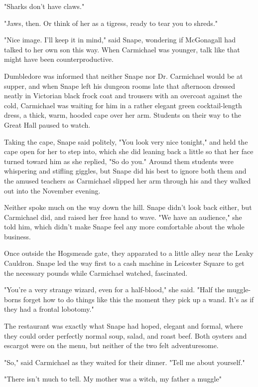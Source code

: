 "Sharks don't have claws."

"Jaws, then. Or think of her as a tigress, ready to tear you to shreds."

"Nice image. I'll keep it in mind," said Snape, wondering if McGonagall had talked to her own son this way. When Carmichael was younger, talk like that might have been counterproductive.

Dumbledore was informed that neither Snape nor Dr. Carmichael would be at supper, and when Snape left his dungeon rooms late that afternoon dressed neatly in Victorian black frock coat and trousers with an overcoat against the cold, Carmichael was waiting for him in a rather elegant green cocktail-length dress, a thick, warm, hooded cape over her arm. Students on their way to the Great Hall paused to watch.

Taking the cape, Snape said politely, "You look very nice tonight," and held the cape open for her to step into, which she did leaning back a little so that her face turned toward him as she replied, "So do you." Around them students were whispering and stifling giggles, but Snape did his best to ignore both them and the amused teachers as Carmichael slipped her arm through his and they walked out into the November evening.

Neither spoke much on the way down the hill. Snape didn't look back either, but Carmichael did, and raised her free hand to wave. "We have an audience," she told him, which didn't make Snape feel any more comfortable about the whole business.

Once outside the Hogsmeade gate, they apparated to a little alley near the Leaky Cauldron. Snape led the way first to a cash machine in Leicester Square to get the necessary pounds while Carmichael watched, fascinated.

"You're a very strange wizard, even for a half-blood," she said. "Half the muggle-borns forget how to do things like this the moment they pick up a wand. It's as if they had a frontal lobotomy."

The restaurant was exactly what Snape had hoped, elegant and formal, where they could order perfectly normal soup, salad, and roast beef. Both oysters and escargot were on the menu, but neither of the two felt adventuresome.

"So," said Carmichael as they waited for their dinner. "Tell me about yourself."

"There isn't much to tell. My mother was a witch, my father a muggle{\el}"

